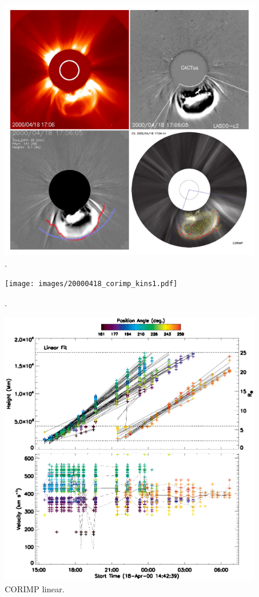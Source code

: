 \documentclass[preprint2]{aastex}
\begin{document}
\begin{figure}[]
\centerline{\includegraphics[width=\linewidth]{images/20000418_four.pdf}}
\caption{.}
\label{}
\end{figure}

\begin{figure}[]
\centerline{\texttt{[image: images/20000418\_corimp\_kins1.pdf]}}
\caption{.}
\label{}
\end{figure}


\begin{figure}[]
\centerline{\includegraphics[width=\linewidth]{images/plot_kins_quartiles_linear_20000418_152817.eps}}
\caption{CORIMP linear.}
\label{}
\end{figure}
\end{document}
